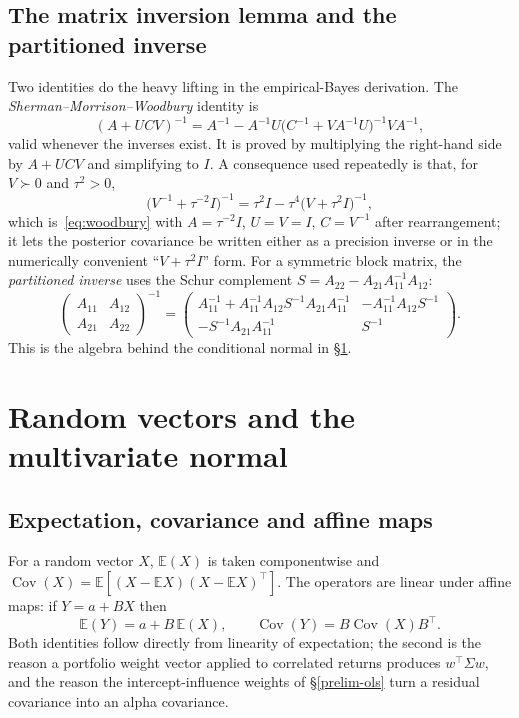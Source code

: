 \subsection{The matrix inversion lemma and the partitioned inverse}

Two identities do the heavy lifting in the empirical-Bayes derivation. The
\emph{Sherman--Morrison--Woodbury} identity is
\begin{equation}\label{eq:woodbury}
(A+UCV)^{-1}=A^{-1}-A^{-1}U\bigl(C^{-1}+VA^{-1}U\bigr)^{-1}VA^{-1},
\end{equation}
valid whenever the inverses exist. It is proved by multiplying the
right-hand side by $A+UCV$ and simplifying to $I$. A consequence used
repeatedly is that, for $V\succ 0$ and $\tau^2>0$,
\begin{equation}\label{eq:eb-woodbury}
\bigl(V^{-1}+\tau^{-2}I\bigr)^{-1}
=\tau^2 I-\tau^4\bigl(V+\tau^2 I\bigr)^{-1},
\end{equation}
which is~\eqref{eq:woodbury} with $A=\tau^{-2}I$, $U=V=I$, $C=V^{-1}$ after
rearrangement; it lets the posterior covariance be written either as a
precision inverse or in the numerically convenient ``$V+\tau^2I$'' form.
For a symmetric block matrix, the \emph{partitioned inverse} uses the
Schur complement $S=A_{22}-A_{21}A_{11}^{-1}A_{12}$:
\begin{equation}
\begin{pmatrix}A_{11}&A_{12}\\A_{21}&A_{22}\end{pmatrix}^{-1}
=\begin{pmatrix}
A_{11}^{-1}+A_{11}^{-1}A_{12}S^{-1}A_{21}A_{11}^{-1} & -A_{11}^{-1}A_{12}S^{-1}\\
-S^{-1}A_{21}A_{11}^{-1} & S^{-1}
\end{pmatrix}.
\end{equation}
This is the algebra behind the conditional normal in \S\ref{prelim-mvn}.

\section{Random vectors and the multivariate normal}\label{prelim-mvn}

\subsection{Expectation, covariance and affine maps}

For a random vector $X$, $\mathbb{E}(X)$ is taken componentwise and
$\operatorname{Cov}(X)=\mathbb{E}[(X-\mathbb{E}X)(X-\mathbb{E}X)^{\top}]$.
The operators are linear under affine maps: if $Y=a+BX$ then
\begin{equation}\label{eq:affine}
\mathbb{E}(Y)=a+B\,\mathbb{E}(X),\qquad
\operatorname{Cov}(Y)=B\operatorname{Cov}(X)B^{\top}.
\end{equation}
Both identities follow directly from linearity of expectation; the second
is the reason a portfolio weight vector applied to correlated returns
produces $w^{\top}\Sigma w$, and the reason the intercept-influence weights
of \S\ref{prelim-ols} turn a residual covariance into an alpha covariance.

